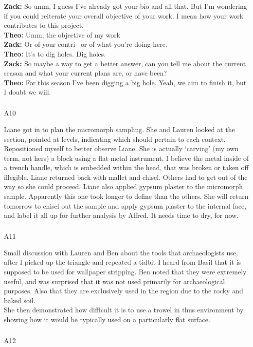 \documentclass[
]{article}
\makeatletter
\let\oldsubparagraph\subparagraph
\renewcommand{\subparagraph}{
    \@ifstar
      \xxxSubParagraphStar
      \xxxSubParagraphNoStar
  }
\newcommand{\xxxSubParagraphStar}[1]{\oldsubparagraph*{#1}\mbox{}}
\newcommand{\xxxSubParagraphNoStar}[1]{\oldsubparagraph{#1}\mbox{}}
\makeatother
\begin{document}
\textbf{Zack:} So umm, I guess I've already got your bio and all that.
But I'm wondering if you could reiterate your overall objective of your
work. I mean how your work contributes to this project.\\
\textbf{Theo:} Umm, the objective of my work\\
\textbf{Zack:} Or of your contri-- or of what you're doing here.\\
\textbf{Theo:} It's to dig holes. Dig holes.\\
\textbf{Zack:} So maybe a way to get a better answer, can you tell me
about the current season and what your current plans are, or have
been?\\
\textbf{Theo:} For this season I've been digging a big hole. Yeah, we
aim to finish it, but I doubt we will.

\subparagraph{A10}\label{sec-A10}

Liane got in to plan the micromorph sampling. She and Lauren looked at
the section, pointed at levels, indicating which should pertain to each
context. Repositioned myself to better observe Liane. She is actually
`carving' (my own term, not hers) a block using a flat metal instrument,
I believe the metal inside of a trench handle, which is embedded within
the head, that was broken or taken off illegible. Liane returned back
with mallet and chisel. Others had to get out of the way so she could
proceed. Liane also applied gypsum plaster to the micromorph sample.
Apparently this one took longer to define than the others. She will
return tomorrow to chisel out the sample and apply gypsum plaster to the
internal face, and label it all up for further analysis by Alfred. It
needs time to dry, for now.

\subparagraph{A11}\label{sec-A11}

Small discussion with Lauren and Ben about the tools that archaeologists
use, after I picked up the triangle and repeated a tidbit I heard from
Basil that it is supposed to be used for wallpaper stripping. Ben noted
that they were extremely useful, and was surprised that it was not used
primarily for archaeological purposes. Also that they are exclusively
used in the region due to the rocky and baked soil.\\
She then demonstrated how difficult it is to use a trowel in thus
environment by showing how it would be typically used on a particularly
flat surface.

\subparagraph{A12}\label{sec-A12}
\end{document}
